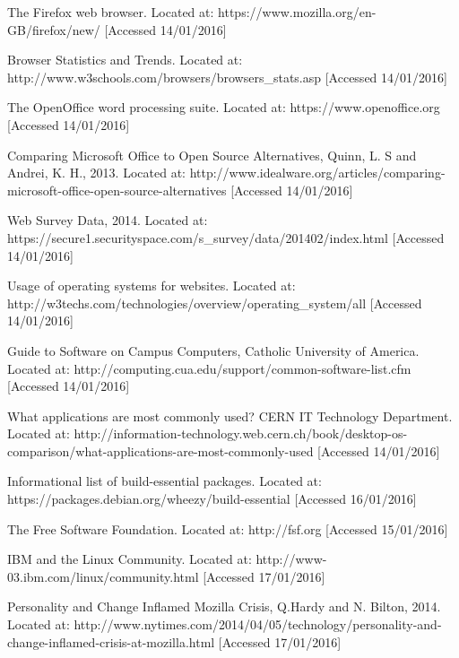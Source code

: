 \begin{thebibliography}{100}

 The Firefox web browser.
  Located at: https://www.mozilla.org/en-GB/firefox/new/ [Accessed 14/01/2016]

 Browser Statistics and Trends.
  Located at: http://www.w3schools.com/browsers/browsers\_stats.asp [Accessed 14/01/2016]

 The OpenOffice word processing suite.
  Located at: https://www.openoffice.org [Accessed 14/01/2016]

 Comparing Microsoft Office to Open Source Alternatives,
  Quinn, L. S and Andrei, K. H.,
  2013.
  Located at: http://www.idealware.org/articles/comparing-microsoft-office-open-source-alternatives [Accessed 14/01/2016]

 Web Survey Data,
  2014.
  Located at: https://secure1.securityspace.com/s\_survey/data/201402/index.html [Accessed 14/01/2016]

 Usage of operating systems for websites.
  Located at: http://w3techs.com/technologies/overview/operating\_system/all [Accessed 14/01/2016]

 Guide to Software on Campus Computers,
  Catholic University of America.
  Located at: http://computing.cua.edu/support/common-software-list.cfm  [Accessed 14/01/2016]

 What applications are most commonly used?
  CERN IT Technology Department.
  Located at: http://information-technology.web.cern.ch/book/desktop-os-comparison/what-applications-are-most-commonly-used [Accessed 14/01/2016]

 Informational list of build-essential packages.
  Located at: https://packages.debian.org/wheezy/build-essential [Accessed 16/01/2016]

 The Free Software Foundation.
  Located at: http://fsf.org [Accessed 15/01/2016]

 IBM and the Linux Community.
	Located at: http://www-03.ibm.com/linux/community.html [Accessed 17/01/2016]

 Personality and Change Inflamed Mozilla Crisis,
    Q.Hardy and N. Bilton,
    2014.
	Located at: http://www.nytimes.com/2014/04/05/technology/personality-and-change-inflamed-crisis-at-mozilla.html [Accessed 17/01/2016]


\end{thebibliography}
